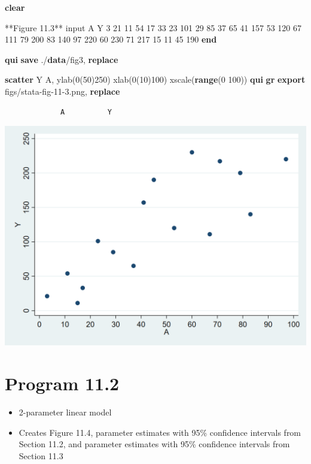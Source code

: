 \documentclass[
  10pt,
]{book}
\newenvironment{Shaded}{\begin{snugshade}}{\end{snugshade}}
\newcommand{\BaseNTok}[1]{\textcolor[rgb]{0.00,0.00,0.81}{#1}}
\newcommand{\KeywordTok}[1]{\textcolor[rgb]{0.13,0.29,0.53}{\textbf{#1}}}
\newcommand{\NormalTok}[1]{#1}
\providecommand{\tightlist}{%
  \setlength{\itemsep}{0pt}\setlength{\parskip}{0pt}}
\begin{document}
\begin{Shaded}
\begin{Highlighting}[]
\KeywordTok{clear}

\NormalTok{**Figure 11.3**}
\NormalTok{input A Y}
\NormalTok{3   21	}
\NormalTok{11	54}
\NormalTok{17	33}
\NormalTok{23	101}
\NormalTok{29	85}
\NormalTok{37	65}
\NormalTok{41	157}
\NormalTok{53	120}
\NormalTok{67	111}
\NormalTok{79	200}
\NormalTok{83	140}
\NormalTok{97	220}
\NormalTok{60	230}
\NormalTok{71	217}
\NormalTok{15	11}
\NormalTok{45  190}
\KeywordTok{end}

\KeywordTok{qui} \KeywordTok{save}\NormalTok{ ./}\KeywordTok{data}\NormalTok{/fig3, }\KeywordTok{replace}

\KeywordTok{scatter}\NormalTok{ Y A, ylab(0(50)250) xlab(0(10)100) }\BaseNTok{xscale}\NormalTok{(}\KeywordTok{range}\NormalTok{(0 100))}
\KeywordTok{qui} \KeywordTok{gr} \KeywordTok{export}\NormalTok{ figs/stata-fig-11-3.png, }\KeywordTok{replace}
\end{Highlighting}
\end{Shaded}

\begin{verbatim}
             A          Y
\end{verbatim}

\begin{center}\includegraphics[width=0.85\linewidth]{figs/stata-fig-11-3} \end{center}

\hypertarget{program-11.2}{%
\section{Program 11.2}\label{program-11.2}}

\begin{itemize}
\tightlist
\item
  2-parameter linear model
\item
  Creates Figure 11.4, parameter estimates with 95\% confidence intervals from Section 11.2, and parameter estimates with 95\% confidence intervals from Section 11.3
\end{itemize}
\end{document}

